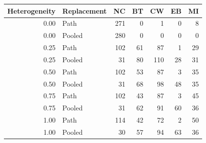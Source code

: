 \begin{tabular}{rlrrrrr}\toprule Heterogeneity & Replacement & NC & BT & CW & EB & MI\\\midrule
0.00 & Path & 271 & 0 & 1 & 0 & 8\\
0.00 & Pooled & 280 & 0 & 0 & 0 & 0\\
0.25 & Path & 102 & 61 & 87 & 1 & 29\\
0.25 & Pooled & 31 & 80 & 110 & 28 & 31\\
0.50 & Path & 102 & 53 & 87 & 3 & 35\\
0.50 & Pooled & 31 & 68 & 98 & 48 & 35\\
0.75 & Path & 102 & 43 & 87 & 3 & 45\\
0.75 & Pooled & 31 & 62 & 91 & 60 & 36\\
1.00 & Path & 114 & 42 & 72 & 2 & 50\\
1.00 & Pooled & 30 & 57 & 94 & 63 & 36\\
\bottomrule\end{tabular}
